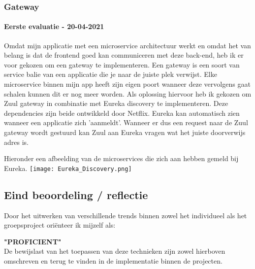 \subsubsection{Gateway}\label{subsec:gateway}
\paragraph{Eerste evaluatie - 20-04-2021}
Omdat mijn applicatie met een microservice architectuur werkt en omdat het van belang is dat de frontend goed kan communiceren met deze back-end, heb ik er voor gekozen om een gateway te implementeren.
Een gateway is een soort van service balie van een applicatie die je naar de juiste plek verwijst.
Elke microservice binnen mijn app heeft zijn eigen poort wanneer deze vervolgens gaat schalen kunnen dit er nog meer worden.
Als oplossing hiervoor heb ik gekozen om Zuul gateway in combinatie met Eureka discovery te implementeren.
Deze dependencies zijn beide ontwikkeld door Netflix.
Eureka kan automatisch zien wanneer een applicatie zich 'aanmeldt'. Wanneer er dus een request naar de Zuul gateway
wordt gestuurd kan Zuul aan Eureka vragen wat het juiste doorverwijs adres is.

Hieronder een afbeelding van de microservices die zich aan hebben gemeld bij Eureka.
\texttt{[image: Eureka\_Discovery.png]}\label{fig:eureka_discovery}


\subsection{Eind beoordeling / reflectie}
Door het uitwerken van verschillende trends binnen zowel het individueel als het groepsproject oriënteer ik mijzelf
als:\\
\par\vspace{10pt}\textbf{\uppercase{"Proficient"}}\\

De bewijslast van het toepassen van deze technieken zijn zowel hierboven omschreven en terug te
vinden in de implementatie binnen de projecten.

\newpage
